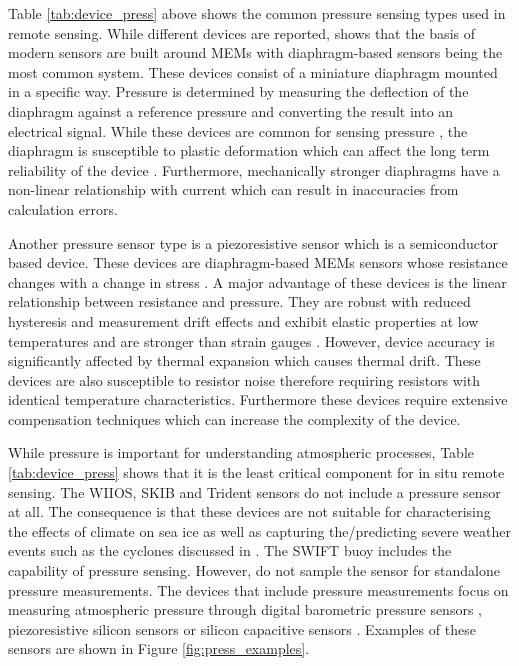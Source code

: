Table \ref{tab:device_press} above shows the common pressure sensing types used in remote sensing. While different devices are reported, \textcite{eaton1997micromachined} shows that the basis of modern sensors are built around MEMs with diaphragm-based sensors being the most common system. These devices consist of a miniature diaphragm mounted in a specific way. Pressure is determined by measuring the deflection of the diaphragm against a reference pressure and converting the result into an electrical signal. While these devices are common for sensing pressure \cite{eaton1997micromachined}, the diaphragm is susceptible to plastic deformation which can affect the long term reliability of the device \cite{eaton1997micromachined}. Furthermore, mechanically stronger diaphragms have a non-linear relationship with current which can result in inaccuracies from calculation errors. \par  

Another pressure sensor type is a piezoresistive sensor which is a semiconductor based device. These devices are diaphragm-based MEMs sensors whose resistance changes with a change in stress \cite{eaton1997micromachined}. A major advantage of these devices is the linear relationship between resistance and pressure. They are robust with reduced hysteresis and measurement drift effects and exhibit elastic properties at low temperatures and are stronger than strain gauges \cite{eaton1997micromachined}. However, device accuracy is significantly affected by thermal expansion which causes thermal drift. These devices are also susceptible to resistor noise therefore requiring resistors with identical temperature characteristics. Furthermore these devices require extensive compensation techniques which can increase the complexity of the device. \par 


While pressure is important for understanding atmospheric processes, Table \ref{tab:device_press} shows that it is the least critical component for in situ remote sensing. The WIIOS, SKIB and Trident sensors do not include a pressure sensor at all. The consequence is that these devices are not suitable for characterising the effects of climate on sea ice as well as capturing the/predicting severe weather events such as the cyclones discussed in \textcite{vichi2019effects}. The SWIFT buoy includes the capability of pressure sensing. However, do not sample the sensor for standalone pressure measurements. The devices that include pressure measurements focus on measuring atmospheric pressure through digital barometric pressure sensors \cite{rabault2019open,planck2019evolution}, piezoresistive silicon sensors \cite{doble2017robust} or silicon capacitive sensors \cite{uptempo}. Examples of these sensors are shown in Figure \ref{fig:press_examples}.


